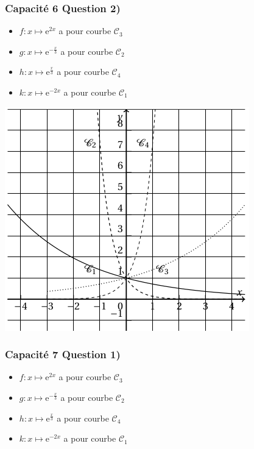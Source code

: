 \documentclass[11pt, hyperref={urlcolor=red,%
            linkcolor=blue, %
            colorlinks=true}]{beamer}
\begin{document}
\begin{frame}
\frametitle{Capacité 6 Question 2)}


	\begin{itemize}
		\item $f:x \mapsto \text{e}^{2x}$ a pour courbe  $\mathcal{C}_{3}$
		\item $g:x \mapsto \text{e}^{-\frac{x}{3}}$ a pour courbe $\mathcal{C}_{2}$
		\item $h:x \mapsto \text{e}^{\frac{x}{3}}$ a pour courbe $\mathcal{C}_{4}$
		\item $k:x \mapsto \text{e}^{-2x}$ a pour courbe $\mathcal{C}_{1}$
	\end{itemize}

\begin{center}
\includegraphics[scale=0.3]{capacite6bisbis.png}
\end{center}


\end{frame}




\begin{frame}
\frametitle{Capacité 7 Question 1)}
\label{capacite7}

	\begin{itemize}
		\item $f:x \mapsto \text{e}^{2x}$ a pour courbe  $\mathcal{C}_{3}$
		\item $g:x \mapsto \text{e}^{-\frac{x}{3}}$ a pour courbe $\mathcal{C}_{2}$
		\item $h:x \mapsto \text{e}^{\frac{x}{3}}$ a pour courbe $\mathcal{C}_{4}$
		\item $k:x \mapsto \text{e}^{-2x}$ a pour courbe $\mathcal{C}_{1}$
	\end{itemize}



\end{frame}



	
	
\end{document}
